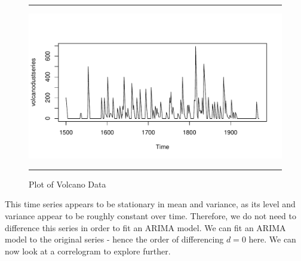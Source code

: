 \documentclass[11pt, letterpaper, twoside]{memoir}\usepackage{knitr}
\begin{document}
\begin{figure}
\centering
\rule{4in}{1pt}
\begin{knitrout}
\color{fgcolor}\begin{kframe}
\begin{alltt}
 \hlkwb{<-} \hlstd{(}\hlstd{,} \hlstd{=}\hlstd{)}
 \hlkwb{<-} \hlstd{=}\hlstd{(}\hlstd{))}
\end{alltt}
\end{kframe}
\includegraphics[width=\maxwidth]{figure/unnamed-chunk-122-1} 

\end{knitrout}
\caption{Plot of Volcano Data}
\label{Fig:voldata}
\rule{4in}{1pt}
\end{figure}

This time series appears to be stationary in mean and variance, as its level and variance appear to be roughly constant over time. Therefore, we do not need to difference this series in order to fit an ARIMA model. We can fit an ARIMA model to the original series - hence the order of differencing $d = 0$ here. We can now look at a correlogram to explore further.
\end{document}
